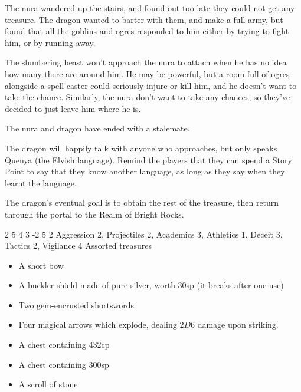 \begin{multicols}{2}
\begin{exampletext}
	The nura wandered up the stairs, and found out too late they could not get any treasure.
	The dragon wanted to barter with them, and make a full army, but found that all the goblins and ogres responded to him either by trying to fight him, or by running away.

	The slumbering beast won't approach the nura to attach when he has no idea how many there are around him.
	He may be powerful, but a room full of ogres alongside a spell caster could seriously injure or kill him, and he doesn't want to take the chance.
	Similarly, the nura don't want to take any chances, so they've decided to just leave him where he is.

	The nura and dragon have ended with a stalemate.

\end{exampletext}

The dragon will happily talk with anyone who approaches, but only speaks Quenya (the Elvish language).
Remind the players that they can spend a Story Point to say that they know another language, as long as they say when they learnt the language.

The dragon's eventual goal is to obtain the rest of the treasure, then return through the portal to the Realm of Bright Rocks.

{2}%
{5}%
{{4}%
{3}%
{-2}}%
{5}%
{2}%
{Aggression 2, Projectiles 2, Academics 3, Athletics 1, Deceit 3, Tactics 2, Vigilance 4}%
{Assorted treasures}%
{}


\begin{itemize}

	\item{A short bow}
	\item{A buckler shield made of pure silver, worth 30sp (it breaks after one use)}
	\item{Two gem-encrusted shortswords}
	\item{Four magical arrows which explode, dealing $2D6$ damage upon striking.}
	\item{A chest containing 432cp}
	\item{A chest containing 300sp}
	\item{A scroll of stone}

\end{itemize}


\end{multicols}
